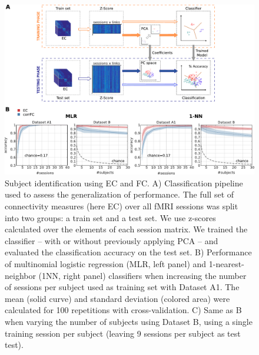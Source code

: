 \documentclass[12pt, a4paper, final, fleqn]{article}
\begin{document}
\begin{figure}[htpb]
	\centering
	\includegraphics[width=0.9\columnwidth]{fig2}
	\caption{Subject identification using EC and FC. A) Classification
	pipeline used to assess the generalization of performance. The full set
of connectivity measures (here EC) over all fMRI sessions was split into two
groups: a train set and a test set. We use z-scores calculated over the
elements of each session matrix. We trained the
classifier – with or without previously applying PCA – and evaluated the
classification accuracy on the test set. B) Performance of multinomial logistic
regression (MLR, left panel) and 1-nearest-neighbor (1NN, right panel)
classifiers when increasing the number of sessions per subject used as training
set with Dataset A1. The mean (solid curve) and standard deviation (colored
area) were calculated for 100 repetitions with cross-validation. C) Same as B
when varying the number of subjects using Dataset B, using a single training
session per subject (leaving 9 sessions per subject as test test).}
	\label{fig:fig2}
\end{figure}
\end{document}
